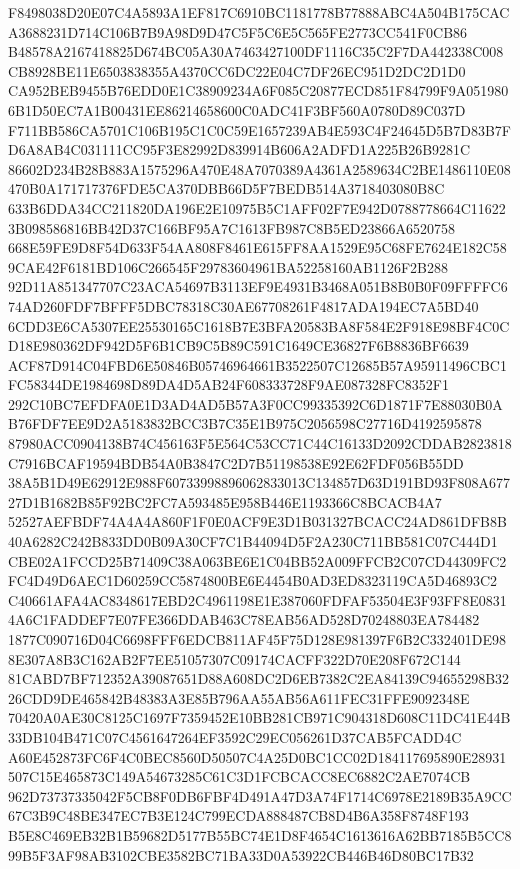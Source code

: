 \documentclass[UTF8,fontset=fandol,zihao=-4,a4paper]{ctexart}
\begin{document}
{{F8498038D20E07C4A5893A1EF817C6910BC1181778B77888ABC4A504B175CACA3688231D714C106B7B9A98D9D47C5F5C6E5C565FE2773CC541F0CB86
B48578A2167418825D674BC05A30A7463427100DF1116C35C2F7DA442338C008CB8928BE11E6503838355A4370CC6DC22E04C7DF26EC951D2DC2D1D0
CA952BEB9455B76EDD0E1C38909234A6F085C20877ECD851F84799F9A0519806B1D50EC7A1B00431EE86214658600C0ADC41F3BF560A0780D89C037D
F711BB586CA5701C106B195C1C0C59E1657239AB4E593C4F24645D5B7D83B7FD6A8AB4C031111CC95F3E82992D839914B606A2ADFD1A225B26B9281C
86602D234B28B883A1575296A470E48A7070389A4361A2589634C2BE1486110E08470B0A171717376FDE5CA370DBB66D5F7BEDB514A3718403080B8C
633B6DDA34CC211820DA196E2E10975B5C1AFF02F7E942D0788778664C116223B098586816BB42D37C166BF95A7C1613FB987C8B5ED23866A6520758
668E59FE9D8F54D633F54AA808F8461E615FF8AA1529E95C68FE7624E182C589CAE42F6181BD106C266545F29783604961BA52258160AB1126F2B288
92D11A851347707C23ACA54697B3113EF9E4931B3468A051B8B0B0F09FFFFC674AD260FDF7BFFF5DBC78318C30AE67708261F4817ADA194EC7A5BD40
6CDD3E6CA5307EE25530165C1618B7E3BFA20583BA8F584E2F918E98BF4C0CD18E980362DF942D5F6B1CB9C5B89C591C1649CE36827F6B8836BF6639
ACF87D914C04FBD6E50846B05746964661B3522507C12685B57A95911496CBC1FC58344DE1984698D89DA4D5AB24F608333728F9AE087328FC8352F1
292C10BC7EFDFA0E1D3AD4AD5B57A3F0CC99335392C6D1871F7E88030B0AB76FDF7EE9D2A5183832BCC3B7C35E1B975C2056598C27716D4192595878
87980ACC0904138B74C456163F5E564C53CC71C44C16133D2092CDDAB2823818C7916BCAF19594BDB54A0B3847C2D7B51198538E92E62FDF056B55DD
38A5B1D49E62912E988F60733998896062833013C134857D63D191BD93F808A67727D1B1682B85F92BC2FC7A593485E958B446E1193366C8BCACB4A7
52527AEFBDF74A4A4A860F1F0E0ACF9E3D1B031327BCACC24AD861DFB8B40A6282C242B833DD0B09A30CF7C1B44094D5F2A230C711BB581C07C444D1
CBE02A1FCCD25B71409C38A063BE6E1C04BB52A009FFCB2C07CD44309FC2FC4D49D6AEC1D60259CC5874800BE6E4454B0AD3ED8323119CA5D46893C2
C40661AFA4AC8348617EBD2C4961198E1E387060FDFAF53504E3F93FF8E08314A6C1FADDEF7E07FE366DDAB463C78EAB56AD528D70248803EA784482
1877C090716D04C6698FFF6EDCB811AF45F75D128E981397F6B2C332401DE988E307A8B3C162AB2F7EE51057307C09174CACFF322D70E208F672C144
81CABD7BF712352A39087651D88A608DC2D6EB7382C2EA84139C94655298B3226CDD9DE465842B48383A3E85B796AA55AB56A611FEC31FFE9092348E
70420A0AE30C8125C1697F7359452E10BB281CB971C904318D608C11DC41E44B33DB104B471C07C4561647264EF3592C29EC056261D37CAB5FCADD4C
A60E452873FC6F4C0BEC8560D50507C4A25D0BC1CC02D184117695890E28931507C15E465873C149A54673285C61C3D1FCBCACC8EC6882C2AE7074CB
962D73737335042F5CB8F0DB6FBF4D491A47D3A74F1714C6978E2189B35A9CC67C3B9C48BE347EC7B3E124C799ECDA888487CB8D4B6A358F8748F193
B5E8C469EB32B1B59682D5177B55BC74E1D8F4654C1613616A62BB7185B5CC899B5F3AF98AB3102CBE3582BC71BA33D0A53922CB446B46D80BC17B32
}}
\end{document}
